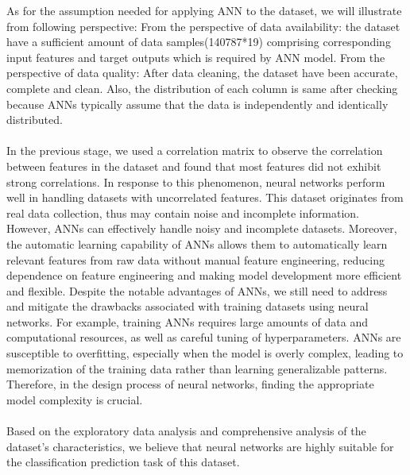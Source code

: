 \documentclass[10pt]{article}
\begin{document}
As for the assumption needed for applying ANN to the dataset, we will illustrate from following perspective: From the perspective of data availability: the dataset have a sufficient amount of data samples(140787*19) comprising corresponding input features and target outputs which is required by ANN model. From the perspective of data quality: After data cleaning, the dataset have been accurate, complete and clean. Also, the distribution of each column is same after checking because ANNs typically assume that the data is independently and identically distributed.
\\\\
In the previous stage, we used a correlation matrix to observe the correlation between features in the dataset and found that most features did not exhibit strong correlations. In response to this phenomenon, neural networks perform well in handling datasets with uncorrelated features. This dataset originates from real data collection, thus may contain noise and incomplete information. However, ANNs can effectively handle noisy and incomplete datasets. Moreover, the automatic learning capability of ANNs allows them to automatically learn relevant features from raw data without manual feature engineering, reducing dependence on feature engineering and making model development more efficient and flexible. Despite the notable advantages of ANNs, we still need to address and mitigate the drawbacks associated with training datasets using neural networks. For example, training ANNs requires large amounts of data and computational resources, as well as careful tuning of hyperparameters. ANNs are susceptible to overfitting, especially when the model is overly complex, leading to memorization of the training data rather than learning generalizable patterns. Therefore, in the design process of neural networks, finding the appropriate model complexity is crucial. 
\\\\
Based on the exploratory data analysis and comprehensive analysis of the dataset's characteristics, we believe that neural networks are highly suitable for the classification prediction task of this dataset.
\end{document}
